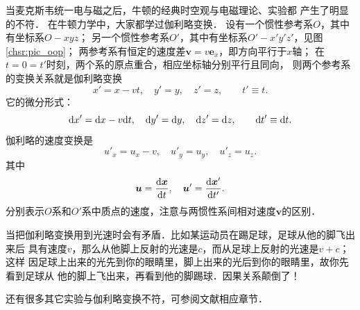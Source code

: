 当麦克斯韦统一电与磁之后，牛顿的经典时空观与电磁理论、实验都
产生了明显的不符．
在牛顿力学中，大家都学过伽利略变换．
设有一个惯性参考系$O$，其中有坐标系$O-xyz$；
另一个惯性参考系$O'$，其中有坐标系$O'-x'y'z'$，见图\ref{chsr:pic_oop}；
两参考系有恒定的速度差$\boldsymbol{v}=v \boldsymbol{e}_x$，即方向平行于$x$轴；
在$t=0=t'$时刻，两个系的原点重合，相应坐标轴分别平行且同向，
则两个参考系的变换关系就是伽利略变换
\begin{equation}\label{chsr:eqn_galileo-trans-x}
    x' = x -vt, \quad
    y' = y, \quad
    z' = z, \qquad
    t' \equiv t.
\end{equation}
它的微分形式：
\begin{equation}\label{chsr:eqn_galileo-trans-dx}
	{\rm d}x' = {\rm d}x -v {\rm d}t, \quad
	{\rm d}y' = {\rm d}y, \quad
	{\rm d}z' = {\rm d}z, \qquad
	{\rm d}t' \equiv {\rm d}t.
\end{equation}
伽利略的速度变换是
\begin{equation}\label{chsr:eqn_galileo-trans-vel}
    u'_x = u_x -v, \quad
    u'_y = u_y, \quad
    u'_z = u_z.
\end{equation}
其中
\begin{equation}\label{chsr:eqn_3-Velocity}
  \boldsymbol{u}=\frac{{\rm d} \boldsymbol{x}}{{\rm d}t}, \quad   \boldsymbol{u}'=\frac{{\rm d} \boldsymbol{x}'}{{\rm d}t'} .
\end{equation}
分别表示$O$系和$O'$系中质点的速度，注意与两惯性系间相对速度$\boldsymbol{v}$的区别．




当把伽利略变换用到光速时会有矛盾．比如某运动员在踢足球，足球从他的脚飞出来后
具有速度$v$，那么从他脚上反射的光速是$c$，而从足球上反射的光速是$v+c$；这样
因足球上出来的光先到你的眼睛里，脚上出来的光后到你的眼睛里，故你先看到足球从
他的脚上飞出来，再看到他的脚踢球．因果关系颠倒了！

还有很多其它实验与伽利略变换不符，可参阅文献\parencite{jackson1998,liu_fei2008,zhangyz-2023}相应章节．




